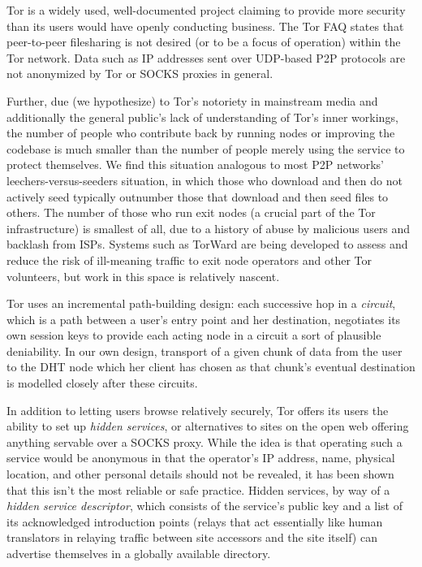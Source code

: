 Tor is a widely used, well-documented project claiming to provide more security than its users would have openly
conducting business. The Tor FAQ states that peer-to-peer filesharing is not desired (or to be a focus of operation)
within the Tor network. Data such as IP addresses sent over UDP-based P2P protocols are not anonymized by Tor or
SOCKS proxies in general.

Further, due (we hypothesize) to Tor's notoriety in mainstream media and additionally the general public's lack of
understanding of Tor's inner workings, the number of people who contribute back by running nodes
or improving the codebase is much smaller than the number of people merely using the service to protect themselves.
We find this situation analogous to most P2P networks' leechers-versus-seeders situation, in which those who download
and then do not actively seed typically outnumber those that download and then seed files to others.
The number of those who run exit nodes (a crucial part of the Tor infrastructure) is smallest of all, due to a history of
abuse by malicious users and backlash from ISPs. Systems such as TorWard are being developed to assess and reduce the
risk of ill-meaning traffic to exit node operators and other Tor volunteers, but work in this space is relatively nascent.

Tor uses an incremental path-building design: each successive hop in a \textit{circuit}, which is a path between a user's entry
point and her destination, negotiates its own session keys to provide each acting node in a circuit a sort of plausible
deniability. In our own design, transport of a given chunk of data from
the user to the DHT node which her client has chosen as that chunk's eventual destination is modelled closely
after these circuits.

In addition to letting users browse relatively securely,
Tor offers its users the ability to set up \textit{hidden services}, or alternatives to sites on the open web offering anything
servable over a SOCKS proxy. While the idea is that operating such a service would be anonymous in that the operator's
IP address, name, physical location, and other personal details should not be revealed, it has been shown that this isn't
the most reliable or safe practice. Hidden services, by way of a \textit{hidden service descriptor},
which consists of the service's public key and a list of its
acknowledged introduction points (relays that act essentially like human translators in relaying traffic between site
accessors and the site itself) can advertise themselves in a globally available directory.

